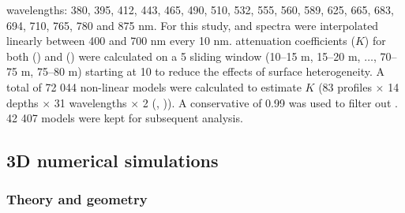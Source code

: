 wavelengths: 380, 395, 412, 443, 465, 490, 510, 532, 555, 560, 589, 625, 665, 683, 694, 710, 765, 780 and 875 nm. For this study, \ed{} and \lu{} spectra were interpolated linearly between 400 and 700 nm every 10 nm. \DIFdelbegin {}\DIFdelend \DIFaddbegin {}\DIFaddend attenuation coefficients ($K$) for both \ed{} (\ked{}) and \lu{} (\klu{}) were calculated on a 5 \DIFdelbegin {}\DIFdelend \DIFaddbegin {}\DIFaddend sliding window (10--15 m, 15--20 m, $\ldots$, 70--75 m, 75--80 m) starting at 10 \DIFdelbegin {}\DIFdelend \DIFaddbegin {}\DIFaddend to reduce the effects of surface heterogeneity. A total of 72 044 non-linear models were calculated to estimate \DIFaddbegin {}\DIFaddend $K$ \DIFdelbegin {}\DIFdelend \DIFaddbegin {} (83 profiles $\times$ 14 depths $\times$ 31 wavelengths $\times$ 2 \DIFdelbegin {}\DIFdelend \DIFaddbegin {}\DIFaddend (\ed{}, \lu{})). A conservative \DIFdelbegin {}\DIFdelend \DIFaddbegin \rsquared{} \DIFaddend of 0.99 was used \DIFaddbegin {}\DIFaddend to filter out \DIFdelbegin {}\DIFdelend \DIFaddbegin {}\DIFaddend . 42 407 models were kept for subsequent analysis.

\subsection{3D \DIFdelbegin {}\DIFdelend \DIFaddbegin {}\DIFaddend numerical simulations}

\subsubsection{Theory and geometry}

